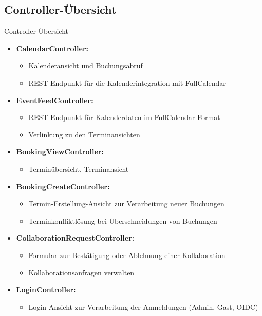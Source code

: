 \documentclass{sdqbeamer}
\begin{document}
\subsection{Controller-Übersicht}
\begin{frame}{Controller-Übersicht}
    \begin{itemize}
        \item \textbf{CalendarController:}
        \begin{itemize}
            \item Kalenderansicht und Buchungsabruf
            \item REST-Endpunkt für die Kalenderintegration mit FullCalendar
        \end{itemize}
        \item \textbf{EventFeedController:}
        \begin{itemize}
            \item REST-Endpunkt für Kalenderdaten im FullCalendar-Format
            \item Verlinkung zu den Terminansichten
        \end{itemize}
        \item \textbf{BookingViewController:}
        \begin{itemize}
            \item Terminübersicht, Terminansicht
        \end{itemize}
        \item \textbf{BookingCreateController:}
        \begin{itemize}
            \item Termin-Erstellung-Ansicht zur Verarbeitung neuer Buchungen
            \item Terminkonfliktlösung bei Überschneidungen von Buchungen
        \end{itemize}
        \item \textbf{CollaborationRequestController:}
        \begin{itemize}
            \item Formular zur Bestätigung oder Ablehnung einer Kollaboration
            \item Kollaborationsanfragen verwalten
        \end{itemize}
        \item \textbf{LoginController:}
        \begin{itemize}
            \item Login-Ansicht zur Verarbeitung der Anmeldungen (Admin, Gast, OIDC)

\end{itemize}
\end{itemize}
\end{frame}
\end{document}
